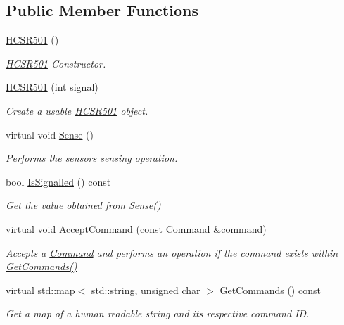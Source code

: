 \subsection*{Public Member Functions}
\begin{DoxyCompactItemize}
\item 
\hyperlink{classrbp_1_1HCSR501_ae6fa939683256d390886b07ef2b2861e}{H\+C\+S\+R501} ()
\begin{DoxyCompactList}\small\item\em \hyperlink{classrbp_1_1HCSR501}{H\+C\+S\+R501} Constructor. \end{DoxyCompactList}\item 
\hyperlink{classrbp_1_1HCSR501_a061fd4c0a4e51ad6118add781b523cbb}{H\+C\+S\+R501} (int signal)
\begin{DoxyCompactList}\small\item\em Create a usable \hyperlink{classrbp_1_1HCSR501}{H\+C\+S\+R501} object. \end{DoxyCompactList}\item 
virtual void \hyperlink{classrbp_1_1HCSR501_a9b0e9b6f210d269b67a1ec94e3b62359}{Sense} ()
\begin{DoxyCompactList}\small\item\em Performs the sensor\textquotesingle{}s sensing operation. \end{DoxyCompactList}\item 
bool \hyperlink{classrbp_1_1HCSR501_a61d40d80c544ffaf3ab75adcd03fdcb3}{Is\+Signalled} () const 
\begin{DoxyCompactList}\small\item\em Get the value obtained from \hyperlink{classrbp_1_1HCSR501_a9b0e9b6f210d269b67a1ec94e3b62359}{Sense()} \end{DoxyCompactList}\item 
virtual void \hyperlink{classrbp_1_1HCSR501_aac9cd8d47aa9df19fb04ed3972e89179}{Accept\+Command} (const \hyperlink{classrbp_1_1Command}{Command} \&command)
\begin{DoxyCompactList}\small\item\em Accepts a \hyperlink{classrbp_1_1Command}{Command} and performs an operation if the command exists within \hyperlink{classrbp_1_1HCSR501_a620a899944b11bf631e3616895fa5a77}{Get\+Commands()} \end{DoxyCompactList}\item 
virtual std\+::map$<$ std\+::string, unsigned char $>$ \hyperlink{classrbp_1_1HCSR501_a620a899944b11bf631e3616895fa5a77}{Get\+Commands} () const 
\begin{DoxyCompactList}\small\item\em Get a map of a human readable string and its respective command I\+D. \end{DoxyCompactList}\item 

\end{DoxyCompactItemize}
